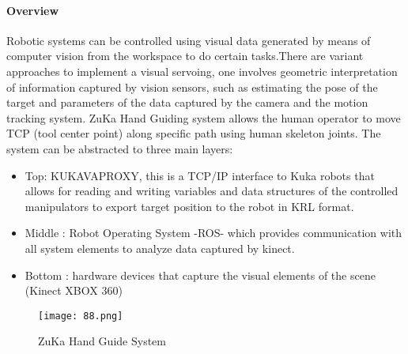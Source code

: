 \paragraph {Overview}
Robotic systems can be controlled using visual data generated by means of computer vision from the workspace to do certain tasks.There are variant approaches to implement a visual servoing, one involves geometric interpretation of information captured by vision sensors, such as estimating the pose of the target and parameters of the data captured by the camera and the motion tracking system. 
\newline \vspace{.5cm}
ZuKa Hand Guiding system allows the human operator to move TCP (tool center point) along specific path using human skeleton joints. The system can be abstracted to three main layers:
\begin{itemize}
	\item Top: KUKAVAPROXY, this is a TCP/IP interface to Kuka robots that allows for reading and writing variables and data structures of the controlled manipulators to export target position to the robot in KRL format.
	
	\item  Middle : Robot Operating System -ROS- which provides communication with all system elements to analyze data captured by kinect.
	
	\item Bottom : hardware devices that capture the visual elements of the scene (Kinect XBOX 360)
\end{itemize}
\begin{figure}[H]
	\centering
	\caption{ZuKa Hand Guide System}
	\texttt{[image: 88.png]}
\end{figure} 

